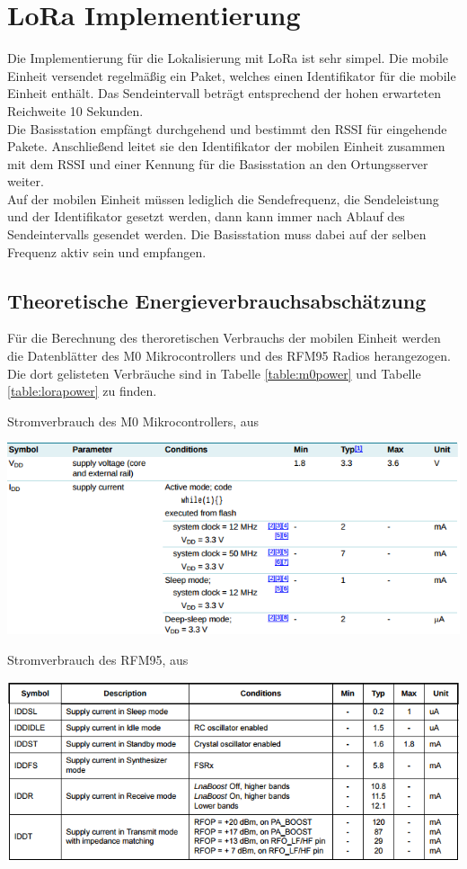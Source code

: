 \section{LoRa Implementierung}
Die Implementierung für die Lokalisierung mit LoRa ist sehr simpel.
Die mobile Einheit versendet regelmäßig ein Paket, welches einen Identifikator für die mobile Einheit enthält.
Das Sendeintervall beträgt entsprechend der hohen erwarteten Reichweite 10 Sekunden.\\
Die Basisstation empfängt durchgehend und bestimmt den RSSI für eingehende Pakete.
Anschließend leitet sie den Identifikator der mobilen Einheit zusammen mit dem RSSI und einer Kennung für die Basisstation an den Ortungsserver weiter.\\
Auf der mobilen Einheit müssen lediglich die Sendefrequenz, die Sendeleistung und der Identifikator gesetzt werden, dann kann immer nach Ablauf des Sendeintervalls gesendet werden.
Die Basisstation muss dabei auf der selben Frequenz aktiv sein und empfangen.

\subsection{Theoretische Energieverbrauchsabschätzung}
Für die Berechnung des theroretischen Verbrauchs der mobilen Einheit werden die Datenblätter des M0 Mikrocontrollers und des RFM95 Radios herangezogen. 
Die dort gelisteten Verbräuche sind in Tabelle \ref{table:m0power} und Tabelle \ref{table:lorapower} zu finden.

\begin{table}[h]
  \centering
  \caption{Stromverbrauch des M0 Mikrocontrollers, aus \cite{nxp2016m0}}
	\includegraphics[width=\textwidth]{images/m0power.png}
  \label{table:m0power}
\end{table}

\begin{table}[h]
  \centering
  \caption{Stromverbrauch des RFM95, aus \cite{hope2006rfm}}
	\includegraphics[width=\textwidth]{images/lorapower.png}
  \label{table:lorapower}
\end{table}

